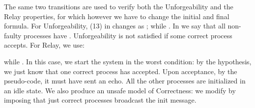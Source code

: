 \documentclass[11pt,a4paper]{article}
\begin{document}
{{\footnotesize

}

The same two transitions are used to verify both the Unforgeability and the Relay properties, for which however we have to change the initial and final formula.  For Unforgeability, (13) in  changes as ; while .
In  we say that all non-faulty processes have .  Unforgeability is not satisfied if some correct process accepts.  For Relay, we use:
{\footnotesize

}
while .  In this case, we start the system in the worst condition: by the hypothesis, we just know that one correct process has accepted.  Upon acceptance, by the pseudo-code, it must have sent an echo.  All the other processes are initialized in an idle state.  We also produce an unsafe model of Correctness: we modify  by imposing that just  correct processes broadcast the init message.

}
\end{document}
